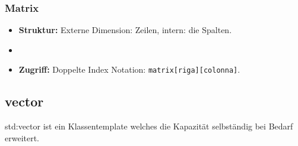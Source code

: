\example{}
\vspace{-1em}

\subsubsection{Matrix}
\begin{itemize}
\item \textbf{Struktur:} Externe Dimension: Zeilen, intern: die Spalten.
\item {}
\item \textbf{Zugriff:} Doppelte Index Notation: \texttt{matrix[riga][colonna]}.
\end{itemize}

\example{}


\subsection{vector}
std:vector ist ein Klassentemplate welches die Kapazität selbständig bei Bedarf erweitert.
